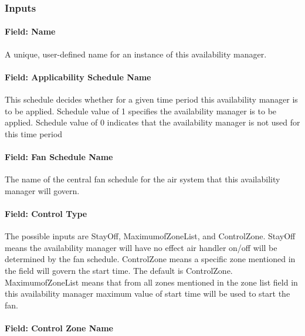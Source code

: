 \subsubsection{Inputs}\label{inputs-11-020}

\paragraph{Field: Name}\label{field-name-10-017}

A unique, user-defined name for an instance of this availability manager.

\paragraph{Field: Applicability Schedule Name}\label{field-applicability-schedule-name-2}

This schedule decides whether for a given time period this availability manager is to be applied. Schedule value of 1 specifies the availability manager is to be applied. Schedule value of 0 indicates that the availability manager is not used for this time period

\paragraph{Field: Fan Schedule Name}\label{field-fan-schedule-name-1}

The name of the central fan schedule for the air system that this availability manager will govern.

\paragraph{Field: Control Type}\label{field-control-type-003}

The possible inputs are StayOff, MaximumofZoneList, and ControlZone. StayOff means the availability manager will have no effect air handler on/off will be determined by the fan schedule. ControlZone means a specific zone mentioned in the field will govern the start time. The default is ControlZone. MaximumofZoneList means that from all zones mentioned in the zone list field in this availability manager maximum value of start time will be used to start the fan.

\paragraph{Field: Control Zone Name}\label{field-control-zone-name-1-000}

